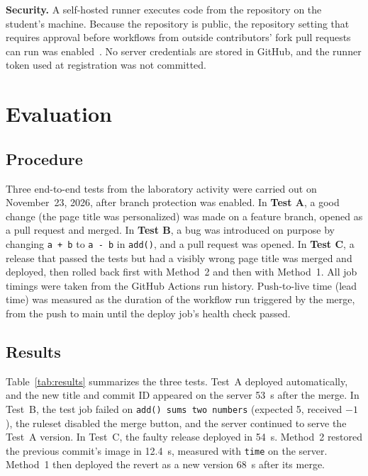 \documentclass[conference]{IEEEtran}
\begin{document}
\textbf{Security.} A self-hosted runner executes code from the repository on the student's machine. Because the repository is public, the repository setting that requires approval before workflows from outside contributors' fork pull requests can run was enabled~\cite{ghrunners,ghsecurity}. No server credentials are stored in GitHub, and the runner token used at registration was not committed.

\section{Evaluation}
\subsection{Procedure}
Three end-to-end tests from the laboratory activity were carried out on November~23, 2026, after branch protection was enabled. In \textbf{Test A}, a good change (the page title was personalized) was made on a feature branch, opened as a pull request and merged. In \textbf{Test B}, a bug was introduced on purpose by changing \texttt{a + b} to \texttt{a - b} in \texttt{add()}, and a pull request was opened. In \textbf{Test C}, a release that passed the tests but had a visibly wrong page title was merged and deployed, then rolled back first with Method~2 and then with Method~1. All job timings were taken from the GitHub Actions run history. Push-to-live time (lead time) was measured as the duration of the workflow run triggered by the merge, from the push to main until the deploy job's health check passed.

\subsection{Results}
Table~\ref{tab:results} summarizes the three tests. Test~A deployed automatically, and the new title and commit ID appeared on the server 53~s after the merge. In Test~B, the test job failed on \texttt{add() sums two numbers} (expected 5, received $-1$), the ruleset disabled the merge button, and the server continued to serve the Test~A version. In Test~C, the faulty release deployed in 54~s. Method~2 restored the previous commit's image in 12.4~s, measured with \texttt{time} on the server. Method~1 then deployed the revert as a new version 68~s after its merge.
\end{document}
